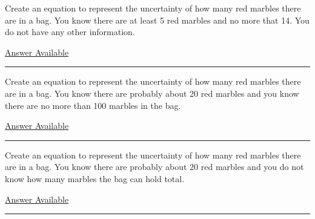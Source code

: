 \documentclass[]{memoir}
\begin{document}

Create an equation to represent the uncertainty of how many red marbles
there are in a bag. You know there are at least 5 red marbles and no
more that 14. You do not have any other information.

\hyperref[Ans-8-2]{Answer Available}

\begin{center}\rule{3in}{0.4pt}\end{center}


Create an equation to represent the uncertainty of how many red marbles
there are in a bag. You know there are probably about 20 red marbles and
you know there are no more than 100 marbles in the bag.

\hyperref[Ans-8-3]{Answer Available}

\begin{center}\rule{3in}{0.4pt}\end{center}


Create an equation to represent the uncertainty of how many red marbles
there are in a bag. You know there are probably about 20 red marbles and
you do not know how many marbles the bag can hold total.

\hyperref[Ans-8-4]{Answer Available}

\begin{center}\rule{3in}{0.4pt}\end{center}
\end{document}

